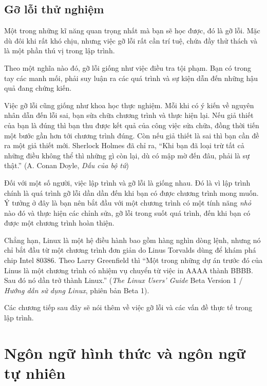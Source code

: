 \documentclass[11pt]{book}
\begin{document}
\subsection{Gỡ lỗi thử nghiệm}

Một trong những kĩ năng quan trọng nhất mà bạn sẽ học được, đó là
gỡ lỗi. Mặc dù đôi khi rất khó chịu, nhưng việc gỡ lỗi rất cần trí
tuệ, chứa đầy thử thách và là một phần thú vị trong lập trình.


Theo một nghĩa nào đó, gỡ lỗi giống như việc điều tra tội phạm. Bạn
có trong tay các manh mối, phải suy luận ra các quá trình và sự kiện
dẫn đến những hậu quả đang chứng kiến.

Việc gỡ lỗi cũng giống như khoa học thực nghiệm. Mỗi khi có ý
kiến về nguyên nhân dẫn đến lỗi sai, bạn sửa chữa chương trình và 
thực hiện lại. Nếu giả thiết của bạn là đúng thì bạn thu được kết
quả của công việc sửa chữa, đồng thời tiến một bước gần hơn tới chương
trình đúng. Còn nếu giả thiết là sai thì bạn cần đề ra một giả thiết mới.
Sherlock Holmes đã chỉ ra, ``Khi bạn đã loại trừ tất cả những điều
không thể thì những gì còn lại, dù có mập mờ đến đâu, phải là sự thật.''
(A. Conan Doyle, {\em Dấu của bộ tứ})


Đối với một số người, việc lập trình và gỡ lỗi là giống nhau. Đó là vì lập
trình chính là quá trình gỡ lỗi dần dần đến khi bạn có được chương trình
mong muốn. Ý tưởng ở đây  là bạn nên bắt đầu với một chương trình
có một tính năng \emph{nhỏ} nào đó và thực hiện các chỉnh sửa, gỡ
lỗi trong suốt quá trình, đến khi bạn có được một chương trình hoàn thiện.

Chẳng hạn, Linux là một hệ điều hành bao gồm hàng nghìn dòng lệnh,
nhưng nó chỉ bắt đầu từ một chương trình đơn giản do Linus Torvalds
dùng để khám phá chip Intel 80386. Theo Larry Greenfield thì ``Một
trong những dự án trước đó của Linus là một chương trình có nhiệm
vụ chuyển từ việc in AAAA thành BBBB. Sau đó nó dần trở thành Linux.''
({\em The Linux Users' Guide} Beta Version 1 / \emph{Hướng dẫn sử dụng
Linux}, phiên bản Beta 1).


Các chương tiếp sau đây sẽ nói thêm về việc gỡ lỗi và các vấn đề
thực tế trong lập trình.

\section{Ngôn ngữ hình thức và ngôn ngữ tự nhiên}
\end{document}
